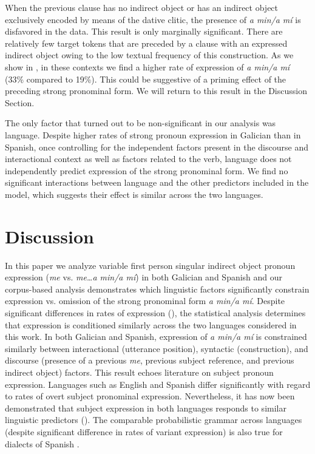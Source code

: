 \documentclass[output=paper]{langscibook}
\begin{document}
When the previous clause has no indirect object or has an indirect object exclusively encoded by means of the dative clitic, the presence of \textit{a min\slash a mí} is disfavored in the data. This result is only marginally significant. There are relatively few target tokens that are preceded by a clause with an expressed indirect object owing to the low textual frequency of this construction. As we show in , in these contexts we find a higher rate of expression of \textit{a min/a mí} (33\% compared to 19\%). This could be suggestive of a priming effect of the preceding strong pronominal form. We will return to this result in the Discussion Section.

The only factor that turned out to be non-significant in our analysis was language. Despite higher rates of strong pronoun expression in Galician than in Spanish, once controlling for the independent factors present in the discourse and interactional context as well as factors related to the verb, language does not independently predict expression of the strong pronominal form. We find no significant interactions between language and the other predictors included in the model, which suggests their effect is similar across the two languages. 

\section{Discussion}

In this paper we analyze variable first person singular indirect object pronoun expression (\textit{me} vs. \textit{me…a min\slash a mí}) in both Galician and Spanish and our corpus-based analysis demonstrates which linguistic factors significantly constrain expression vs. omission of the strong pronominal form \textit{a min\slash a mí}. Despite significant differences in rates of expression (), the statistical analysis determines that expression is conditioned similarly across the two languages considered in this work. In both Galician and Spanish, expression of \textit{a min\slash a mí} is constrained similarly between interactional (utterance position), syntactic (construction), and discourse (presence of a previous \textit{me}, previous subject reference, and previous indirect object) factors. This result echoes literature on subject pronoun expression. Languages such as English and Spanish differ significantly with regard to rates of overt subject pronominal expression. Nevertheless, it has now been demonstrated that subject expression in both languages responds to similar linguistic predictors (\citealt{TorresCacoullosTravis2019}). The comparable probabilistic grammar across languages (despite significant difference in rates of variant expression) is also true for dialects of Spanish \citep{CarvalhoShin2015}.
\end{document}
